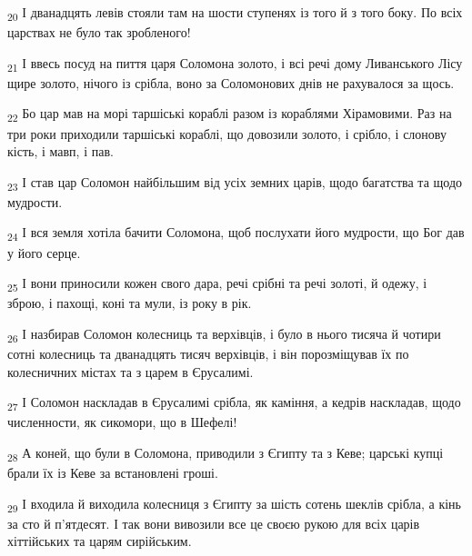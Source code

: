 \begin{tcolorbox}
\textsubscript{20} І дванадцять левів стояли там на шости ступенях із того й з того боку. По всіх царствах не було так зробленого!
\end{tcolorbox}
\begin{tcolorbox}
\textsubscript{21} І ввесь посуд на пиття царя Соломона золото, і всі речі дому Ливанського Лісу щире золото, нічого із срібла, воно за Соломонових днів не рахувалося за щось.
\end{tcolorbox}
\begin{tcolorbox}
\textsubscript{22} Бо цар мав на морі таршіські кораблі разом із кораблями Хірамовими. Раз на три роки приходили таршіські кораблі, що довозили золото, і срібло, і слонову кість, і мавп, і пав.
\end{tcolorbox}
\begin{tcolorbox}
\textsubscript{23} І став цар Соломон найбільшим від усіх земних царів, щодо багатства та щодо мудрости.
\end{tcolorbox}
\begin{tcolorbox}
\textsubscript{24} І вся земля хотіла бачити Соломона, щоб послухати його мудрости, що Бог дав у його серце.
\end{tcolorbox}
\begin{tcolorbox}
\textsubscript{25} І вони приносили кожен свого дара, речі срібні та речі золоті, й одежу, і зброю, і пахощі, коні та мули, із року в рік.
\end{tcolorbox}
\begin{tcolorbox}
\textsubscript{26} І назбирав Соломон колесниць та верхівців, і було в нього тисяча й чотири сотні колесниць та дванадцять тисяч верхівців, і він порозміщував їх по колесничних містах та з царем в Єрусалимі.
\end{tcolorbox}
\begin{tcolorbox}
\textsubscript{27} І Соломон наскладав в Єрусалимі срібла, як каміння, а кедрів наскладав, щодо численности, як сикомори, що в Шефелі!
\end{tcolorbox}
\begin{tcolorbox}
\textsubscript{28} А коней, що були в Соломона, приводили з Єгипту та з Кеве; царські купці брали їх із Кеве за встановлені гроші.
\end{tcolorbox}
\begin{tcolorbox}
\textsubscript{29} І входила й виходила колесниця з Єгипту за шість сотень шеклів срібла, а кінь за сто й п'ятдесят. І так вони вивозили все це своєю рукою для всіх царів хіттійських та царям сирійським.
\end{tcolorbox}
